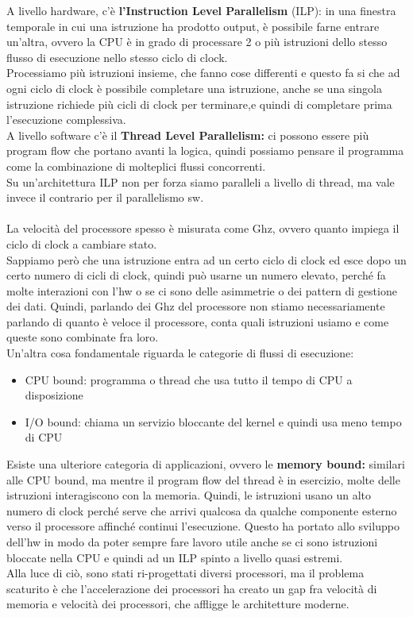 \documentclass[14pt, oneside]{book}
\begin{document}
A livello hardware, c'è \textbf{l'Instruction Level Parallelism} (ILP): in una finestra temporale in cui una istruzione ha prodotto output, è possibile farne entrare un'altra, ovvero la CPU è in grado di processare 2 o più istruzioni dello stesso flusso di esecuzione nello stesso ciclo di clock.\\ Processiamo più istruzioni insieme, che fanno cose differenti e questo fa si che ad ogni ciclo di clock è possibile completare una istruzione, anche se una singola istruzione richiede più cicli di clock per terminare,e quindi di completare prima l'esecuzione complessiva.\\ A livello software c'è il \textbf{Thread Level Parallelism: }ci possono essere più program flow che portano avanti la logica, quindi possiamo pensare il programma come la combinazione di molteplici flussi concorrenti.\\ Su un'architettura ILP non per forza siamo paralleli a livello di thread, ma vale invece il contrario per il parallelismo sw.\\\\ La velocità del processore spesso è misurata come Ghz, ovvero quanto impiega il ciclo di clock a cambiare stato.\\ Sappiamo però che una istruzione entra ad un certo ciclo di clock ed esce dopo un certo numero di cicli di clock, quindi può usarne un numero elevato, perché fa molte interazioni con l'hw o se ci sono delle asimmetrie o dei pattern di gestione dei dati. Quindi, parlando dei Ghz del processore non stiamo necessariamente parlando di quanto è veloce il processore, conta quali istruzioni usiamo e come queste sono combinate fra loro.\\ Un'altra cosa fondamentale riguarda le categorie di flussi di esecuzione:
\begin{itemize}
\item CPU bound: programma o thread che usa tutto il tempo di CPU a disposizione
\item I/O bound: chiama un servizio bloccante del kernel e quindi usa meno tempo di CPU
\end{itemize}
Esiste una ulteriore categoria di applicazioni, ovvero le \textbf{memory bound:} similari alle CPU bound, ma mentre il program flow del thread è in esercizio, molte delle istruzioni interagiscono con la memoria. Quindi, le istruzioni usano un alto numero di clock perché serve che arrivi qualcosa da qualche componente esterno verso il processore affinché continui l'esecuzione. Questo ha portato allo sviluppo dell'hw in modo da poter sempre fare lavoro utile anche se ci sono istruzioni bloccate nella CPU e quindi ad un ILP spinto a livello quasi estremi.\\ Alla luce di ciò, sono stati ri-progettati diversi processori, ma il problema scaturito è che l'accelerazione dei processori ha creato un gap fra velocità di memoria e velocità dei processori, che affligge le architetture moderne.
\end{document}
